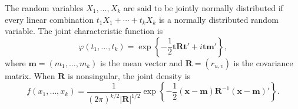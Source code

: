 The random variables $X_1, \ldots, X_k$ are said to be jointly normally distributed if every linear combination $t_1 X_1 + \cdots + t_k X_k$ is a normally distributed random variable. The joint characteristic function is
$$\varphi(t_1, \ldots, t_k) = \exp\left\{-\frac{1}{2} \mathbf{t} \mathbf{R} \mathbf{t}' + i \mathbf{t} \mathbf{m}'\right\},$$
where $\mathbf{m} = (m_1, \ldots, m_k)$ is the mean vector and $\mathbf{R} = (r_{u,v})$ is the covariance matrix. When $\mathbf{R}$ is nonsingular, the joint density is
$$f(x_1, \ldots, x_k) = \frac{1}{(2\pi)^{k/2} |\mathbf{R}|^{1/2}} \exp\left\{-\frac{1}{2} (\mathbf{x} - \mathbf{m}) \mathbf{R}^{-1} (\mathbf{x} - \mathbf{m})'\right\}.$$
